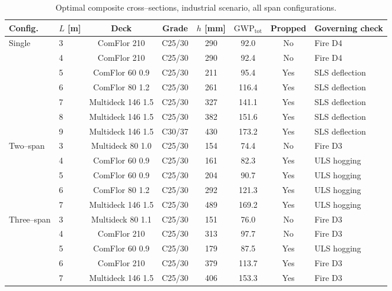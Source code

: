 \begin{table}[h!]
\small\centering
\caption{Optimal composite cross--sections, industrial scenario, all span configurations.}
\label{tab:industrial_optima}
\begin{tabular}{llcccccl}
\toprule
Config. & $L$ [m] & Deck & Grade & $h$ [mm] & $\mathrm{GWP}_\mathrm{tot}$ & Propped & Governing check \\
\midrule
\multirow{7}{*}{Single}
 & 3 & ComFlor 210       & C25/30 & 290 & 92.0  & No  & Fire D4 \\
 & 4 & ComFlor 210       & C25/30 & 290 & 92.4  & No  & Fire D4 \\
 & 5 & ComFlor 60 0.9    & C25/30 & 211 & 95.4  & Yes & SLS deflection \\
 & 6 & ComFlor 80 1.2    & C25/30 & 261 & 116.4 & Yes & SLS deflection \\
 & 7 & Multideck 146 1.5 & C25/30 & 327 & 141.1 & Yes & SLS deflection \\
 & 8 & Multideck 146 1.5 & C25/30 & 382 & 151.6 & Yes & SLS deflection \\
 & 9 & Multideck 146 1.5 & C30/37 & 430 & 173.2 & Yes & SLS deflection \\
\midrule
\multirow{5}{*}{Two--span}
 & 3 & Multideck 80 1.0  & C25/30 & 154 & 74.4  & No  & Fire D3 \\
 & 4 & ComFlor 60 0.9    & C25/30 & 161 & 82.3  & Yes & ULS hogging \\
 & 5 & ComFlor 60 0.9    & C25/30 & 204 & 90.7  & Yes & ULS hogging \\
 & 6 & ComFlor 80 1.2    & C25/30 & 292 & 121.3 & Yes & ULS hogging \\
 & 7 & Multideck 146 1.5 & C25/30 & 489 & 169.2 & Yes & ULS hogging \\
\midrule
\multirow{5}{*}{Three--span}
 & 3 & Multideck 80 1.1  & C25/30 & 151 & 76.0  & No  & Fire D3 \\
 & 4 & ComFlor 210       & C25/30 & 313 & 97.7  & No  & Fire D3 \\
 & 5 & ComFlor 60 0.9    & C25/30 & 179 & 87.5  & Yes & ULS hogging \\
 & 6 & ComFlor 210       & C25/30 & 379 & 113.7 & Yes & Fire D3 \\
 & 7 & Multideck 146 1.5 & C25/30 & 406 & 153.3 & Yes & Fire D3 \\
\bottomrule
\end{tabular}
\end{table}

